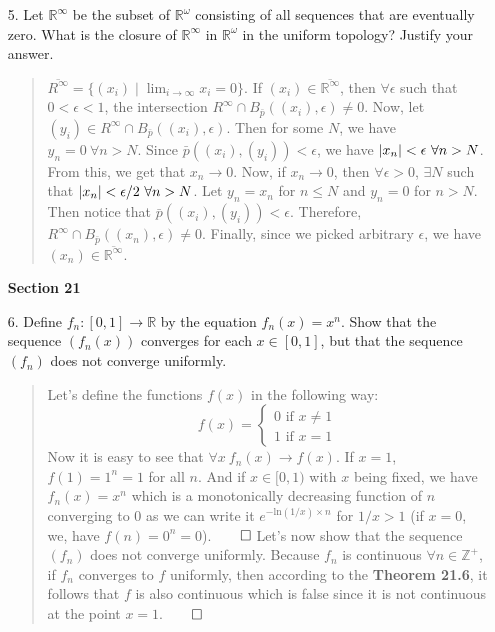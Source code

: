 \documentclass[12pt, a4paper]{article}
\newcommand{\pints}{\mathbb{Z}^+} %
\newcommand{\reals}{\mathbb{R}} %
\newcommand\und[1]{\underline{\smash{#1}}}
\DeclarePairedDelimiter\abs{\lvert}{\rvert}
\newcommand{\rarr}{\rightarrow}
\begin{document}
\begin{itemize}
\item[5.]
Let $\reals^\infty$ be the subset of $\reals^\omega$ consisting of all sequences
that are eventually zero. What is the closure of $\reals^\infty$ in $\reals^\omega$
in the uniform topology? Justify your answer.
\begin{quote}
$\overline{R^\infty} = \{(x_i) \mid \displaystyle\lim_{i \rarr \infty}x_i = 0\}$.
\newline
\newline
\und{Justification}
\vspace{0.2cm}
\newline
If $(x_i) \in \overline{\reals^\infty}$, then $\forall \epsilon$ such that $0 < \epsilon < 1$,
the intersection $R^\infty \cap B_{\bar{p}}((x_i), \epsilon) \neq 0$.
Now, let $(y_i) \in R^\infty \cap B_{\bar{p}}((x_i), \epsilon)$. Then for some $N$,
we have $y_n = 0 \ \forall n > N$. Since $\bar{p}((x_i), (y_i)) < \epsilon$,
we have $\abs{x_n} < \epsilon \ \forall n > N$. From this, we get that $x_n \rarr 0$.
Now, if $x_n \rarr 0$, then $\forall \epsilon > 0$, $\exists N$ such that $\abs{x_n} < \epsilon/2 \ \forall n > N$.
Let $y_n = x_n$ for $n \leq N$ and $y_n = 0$ for $n > N$. Then notice that  $\bar{p}((x_i), (y_i)) < \epsilon$.
Therefore, $R^\infty \cap B_{\bar{p}}((x_n), \epsilon) \neq 0$. Finally, since we picked arbitrary $\epsilon$,
we have $(x_n) \in \overline{\reals^\infty}$.
\end{quote}

\item[]
\item[]
\item[]
{\large \textbf{Section 21}}
\vspace{0.3cm}

\item[6.]
Define $f_n : [0, 1] \rarr \reals$ by the equation $f_n(x) = x^n$.
Show that the sequence $(f_n(x))$ converges for each $x \in [0, 1]$,
but that the sequence $(f_n)$ does not converge uniformly.
\begin{quote}
Let's define the functions $f(x)$ in the following way:
$$
f(x) =
\begin{cases}
0 \mbox{ if } x \neq 1\\
1 \mbox{ if } x = 1
\end{cases}
$$
Now it is easy to see that $\forall x \ f_n(x) \rarr f(x)$. If $x = 1$,
$f(1) = 1^n = 1$ for all $n$. And if $x \in [0, 1)$
with $x$ being fixed, we have $f_n(x) = x^n$ which is a monotonically decreasing
function of $n$ converging to $0$ as we can write it $e^{-\mbox{ln}(1/x) \times n}$
for $1/x > 1$ (if $x = 0$, we, have $f(n) = 0^n = 0$).$\qed$
\newline
\newline 
Let's now show that the sequence $(f_n)$ does not converge uniformly.
Because $f_n$ is continuous $\forall n \in \pints$, if $f_n$ converges to $f$
uniformly, then according to the \textbf{Theorem 21.6}, it follows that $f$
is also continuous which is false since it is not continuous at the point $x = 1$.$\qed$
\end{quote}


\end{itemize}
\end{document}
